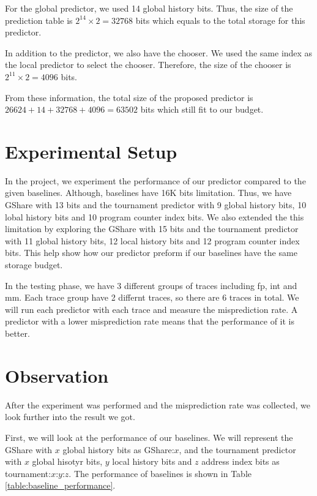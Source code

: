 \documentclass[conference]{IEEEtran}
\begin{document}
For the global predictor, we used 14 global history bits. Thus, the size of the prediction
table is $2^{14} \times 2 = 32768$ bits which equals to the total storage for this predictor.

In addition to the predictor, we also have the chooser. We used the same index as the local predictor
to select the chooser. Therefore, the size of the chooser is $2^{11} \times 2 = 4096$ bits.

From these information, the total size of the proposed predictor is
$26624 + 14 + 32768 + 4096 = 63502$ bits which still fit to our budget.

\section{Experimental Setup}

In the project, we experiment the performance of our predictor compared to the given baselines.
Although, baselines have 16K bits limitation. Thus, we have GShare with 13 bits and the tournament
predictor with 9 global history bits, 10 lobal history bits and 10 program counter index bits.
We also extended the this limitation
by exploring the GShare with 15 bits and the tournament predictor with
11 global history bits, 12 local history bits and 12 program counter index bits.
This help show how our predictor preform if our baselines have the same storage budget.

In the testing phase, we have 3 different groups of traces including fp, int and mm.
Each trace group have 2 differnt traces, so there are 6 traces in total. We will run
each predictor with each trace and measure the misprediction rate. A predictor with a lower misprediction rate
means that the performance of it is better.

\section{Observation}

After the experiment was performed and the misprediction rate was collected, we look
further into the result we got.

First, we will look at the performance of our baselines. We will represent the
GShare with $x$ global history bits as GShare:$x$, and the tournament predictor
with $x$ global hisotyr bits, $y$ local history bits and $z$ address index bits
as tournament:$x$:$y$:$z$. The performance of baselines is shown in Table \ref{table:baseline_performance}.
\end{document}

